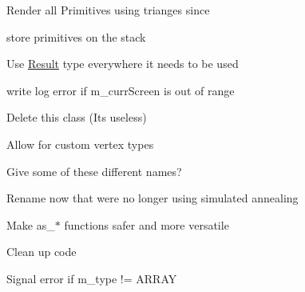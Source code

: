 \begin{DoxyRefList}
\item[\label{todo__todo000027}%
\Hypertarget{todo__todo000027}%
Member \hyperlink{classnta_1_1PrimitiveBatch_a8b1bcf740a16d65a79566c0a9aebd117}{nta\+:\+:Primitive\+Batch\+:\+:create\+Render\+Batches} ()]Render all Primitives using trianges since  
\item[\label{todo__todo000010}%
\Hypertarget{todo__todo000010}%
Member \hyperlink{classnta_1_1PrimitiveBatch_a85b1ab0111c7d02d5899f47fe1946c4f}{nta\+:\+:Primitive\+Batch\+:\+:m\+\_\+primitives} ]store primitives on the stack  
\item[\label{todo__todo000004}%
\Hypertarget{todo__todo000004}%
Class \hyperlink{classnta_1_1Result}{nta\+:\+:Result$<$ T $>$} ]Use \hyperlink{classnta_1_1Result}{Result} type everywhere it needs to be used  
\item[\label{todo__todo000028}%
\Hypertarget{todo__todo000028}%
Member \hyperlink{classnta_1_1ScreenManager_a4b26e8adc481bfb37a088e047e4ccc2a}{nta\+:\+:Screen\+Manager\+:\+:get\+Curr\+Screen} () const]write log error if m\+\_\+curr\+Screen is out of range  
\item[\label{todo__todo000011}%
\Hypertarget{todo__todo000011}%
Class \hyperlink{classnta_1_1Sprite}{nta\+:\+:Sprite} ]Delete this class (It\textquotesingle{}s useless)  
\item[\label{todo__todo000012}%
\Hypertarget{todo__todo000012}%
Class \hyperlink{classnta_1_1SpriteBatch}{nta\+:\+:Sprite\+Batch} ]Allow for custom vertex types  
\item[\label{todo__todo000014}%
\Hypertarget{todo__todo000014}%
Member \hyperlink{classnta_1_1SpriteBatch_aa703fb92d0bd42865c21fdfb2625660d}{nta\+:\+:Sprite\+Batch\+:\+:add\+Glyph} (crvec4 pos\+Rect, crvec4 uv\+Rect, G\+Luint texture, float depth=N\+T\+A\+\_\+\+D\+E\+F\+A\+U\+L\+T\+\_\+\+D\+E\+P\+TH, crvec4 color=glm\+::vec4(1))]Give some of these different names?  
\item[\label{todo__todo000029}%
\Hypertarget{todo__todo000029}%
Member \hyperlink{classnta_1_1SpriteFont_a9dc96f31efd0830dcb476ea87534e358}{nta\+:\+:Sprite\+Font\+:\+:Sprite\+Font} (crstring font\+Path, unsigned int size)]Rename now that we\textquotesingle{}re no longer using simulated annealing  
\item[\label{todo__todo000006}%
\Hypertarget{todo__todo000006}%
Class \hyperlink{classnta_1_1utils_1_1Json}{nta\+:\+:utils\+:\+:Json} ]Make as\+\_\+$\ast$ functions safer and more versatile 
\item[\label{todo__todo000023}%
\Hypertarget{todo__todo000023}%
Member \hyperlink{classnta_1_1utils_1_1Json_ab0e60f7a55d12aab005d420c8f924035}{nta\+:\+:utils\+:\+:Json\+:\+:dump} (std\+::size\+\_\+t indent=0, std\+::size\+\_\+t offset=0) const]Clean up code  
\item[\label{todo__todo000021}%
\Hypertarget{todo__todo000021}%
Member \hyperlink{classnta_1_1utils_1_1Json_a893f191111e604995488d147aaa711f8}{nta\+:\+:utils\+:\+:Json\+:\+:operator\mbox{[}\mbox{]}} (std\+::size\+\_\+t idx) const]Signal error if m\+\_\+type != A\+R\+R\+AY 


\end{DoxyRefList}
